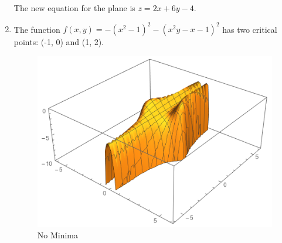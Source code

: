\documentclass{article}
\begin{document}
\begin{enumerate}[1.]
    The new equation for the plane is $z = 2x + 6y - 4$.

  \item The function $f(x, y) = -(x^{2} - 1)^{2} - (x^{2}y - x - 1)^{2}$ has two
    critical points: (-1, 0) and (1, 2).

    \begin{figure}[H]
      \centering
      \includegraphics[scale=0.60]{"NoMinima"}
      \caption{No Minima}
    \end{figure}
\end{enumerate}
\end{document}
